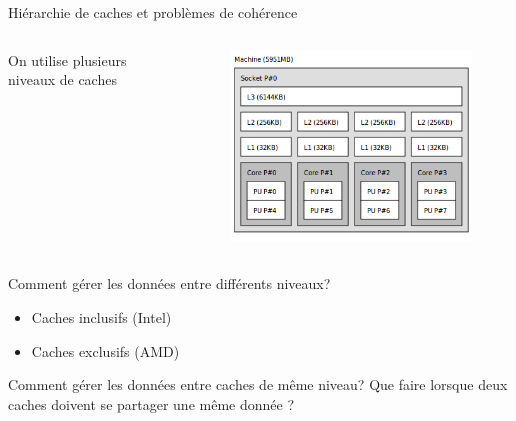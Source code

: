 \begin{frame}{Hiérarchie de caches et problèmes de cohérence}
	\begin{columns}[c]
		\begin{column}{.6\textwidth}
			On utilise plusieurs niveaux de caches
		\end{column}
		\begin{column}{.4\textwidth}
			\begin{figure}[h!]
				\includegraphics[scale=.3]{images/lstopo.png}
			\end{figure}
		\end{column}
	\end{columns}
\begin{block}{Comment gérer les données entre différents niveaux?}
		\begin{itemize}
			\item{Caches inclusifs (Intel)}
			\item{Caches exclusifs (AMD)}
		\end{itemize}
	\end{block}
	\begin{block}{Comment gérer les données entre caches de même niveau?}
		Que faire lorsque deux caches doivent se partager une même donnée ?
	\end{block}
\end{frame}
